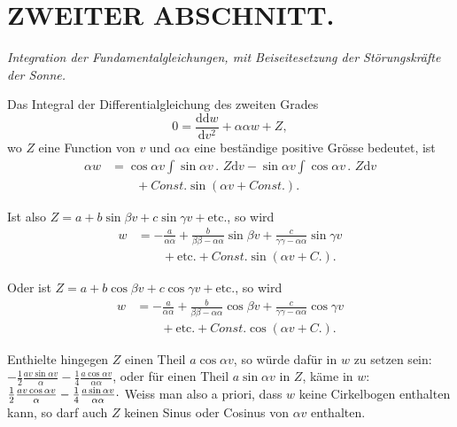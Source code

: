 \clearpage
\begingroup
{}
\renewcommand{\headrulewidth}{0pt}
\section*{ZWEITER ABSCHNITT.}
\begin{center}
\itshape Integration der Fundamentalgleichungen, mit Beiseitesetzung der
Störungskräfte der Sonne.
\end{center}

\par\noindent\hspace*{\parindent}

\par\noindent\hspace*{\parindent}Das Integral der Differentialgleichung des zweiten Grades
\[
0=\frac{\mathrm{dd}w}{\mathrm{d}v^2}+\alpha\alpha w+Z,
\]
\noindent wo \(Z\) eine Function von \(v\) und \(\alpha\alpha\) eine beständige
positive Grösse bedeutet, ist
\[
\begin{aligned}
\alpha w&=\cos\alpha v\int\sin\alpha v\mathpunct{.}\,Z\mathrm{d}v
 -\sin\alpha v\int\cos\alpha v\mathpunct{.}\,Z\mathrm{d}v\\
 &\qquad+\mathit{Const.}\sin(\alpha v+\mathit{Const.}).
\end{aligned}
\]

\par\noindent\hspace*{\parindent}Ist also \(Z=a+b\sin\beta v+c\sin\gamma v+\mathrm{etc.}\), so wird
\[
\begin{aligned}
w&=-\frac{a}{\alpha\alpha}+\frac{b}{\beta\beta-\alpha\alpha}\sin\beta v
 +\frac{c}{\gamma\gamma-\alpha\alpha}\sin\gamma v\\
 &\qquad+\mathrm{etc.}+\mathit{Const.}\sin(\alpha v+C.).
\end{aligned}
\]

\par\noindent Oder ist \(Z=a+b\cos\beta v+c\cos\gamma v+\mathrm{etc.}\), so wird
\[
\begin{aligned}
w&=-\frac{a}{\alpha\alpha}+\frac{b}{\beta\beta-\alpha\alpha}\cos\beta v
 +\frac{c}{\gamma\gamma-\alpha\alpha}\cos\gamma v\\
 &\qquad+\mathrm{etc.}+\mathit{Const.}\cos(\alpha v+C.).
\end{aligned}
\]

\par\noindent\hspace*{\parindent}Enthielte hingegen \(Z\) einen Theil \(a\cos\alpha v\), so würde dafür in
\(w\) zu setzen sein: \(-\tfrac12\frac{av\sin\alpha v}{\alpha}
-\tfrac14\frac{a\cos\alpha v}{\alpha\alpha}\), oder für einen Theil
\(a\sin\alpha v\) in \(Z\), käme in \(w\):
\(\tfrac12\frac{av\cos\alpha v}{\alpha}
-\tfrac14\frac{a\sin\alpha v}{\alpha\alpha}\mathpunct{\raisebox{.4ex}{.}}\)
Weiss man also a priori, dass \(w\) keine Cirkelbogen enthalten kann, so darf
auch \(Z\) keinen Sinus oder Cosinus von \(\alpha v\) enthalten.


